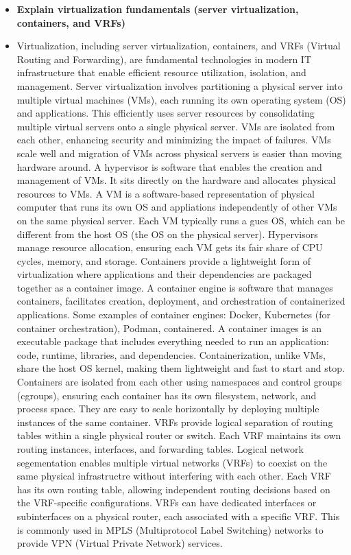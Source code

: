 \documentclass{article}
\begin{document}
\begin{itemize}
  \item \textbf{Explain virtualization fundamentals (server virtualization, containers, and VRFs)}
  	\item[] Virtualization, including server virtualization, containers, and VRFs (Virtual Routing and Forwarding), are fundamental technologies in modern IT infrastructure that enable efficient resource utilization, isolation, and management. Server virtualization involves partitioning a physical server into multiple virtual machines (VMs), each running its own operating system (OS) and applications. This efficiently uses server resources by consolidating multiple virtual servers onto a single physical server. VMs are isolated from each other, enhancing security and minimizing the impact of failures. VMs scale well and migration of VMs across physical servers is easier than moving hardware around. A hypervisor is software that enables the creation and management of VMs. It sits directly on the hardware and allocates physical resources to VMs. A VM is a software-based representation of physical computer that runs its own OS and appliations independently of other VMs on the same physical server. Each VM typically runs a gues OS, which can be different from the host OS (the OS on the physical server). Hypervisors manage resource allocation, ensuring each VM gets its fair share of CPU cycles, memory, and storage. Containers provide a lightweight form of virtualization where applications and their dependencies are packaged together as a container image. A container engine is software that manages containers, facilitates creation, deployment, and orchestration of containerized applications. Some examples of container engines: Docker, Kubernetes (for container orchestration), Podman, containered. A container images is an executable package that includes everything needed to run an application: code, runtime, libraries, and dependencies. Containerization, unlike VMs, share the host OS kernel, making them lightweight and fast to start and stop. Containers are isolated from each other using namespaces and control groups (cgroups), ensuring each container has its own filesystem, network, and process space. They are easy to scale horizontally by deploying multiple instances of the same container. VRFs provide logical separation of routing tables within a single physical router or switch. Each VRF maintains its own routing instances, interfaces, and forwarding tables. Logical network segementation enables multiple virtual networks (VRFs) to coexist on the same physical infrastructre without interfering with each other. Each VRF has its own routing table, allowing independent routing decisions based on the VRF-specific configurations. VRFs can have dedicated interfaces or subinterfaces on a physical router, each associated with a specific VRF. This is commonly used in MPLS (Multiprotocol Label Switching) networks to provide VPN (Virtual Private Network) services.


\end{itemize}
\end{document}
